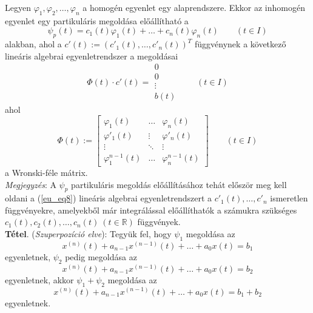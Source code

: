 \documentclass[12pt,margin=0px]{article}
\begin{document}
    \noindent Legyen $\varphi_1, \varphi_2, \ldots, \varphi_n$ a homogén egyenlet egy alaprendszere. Ekkor az inhomogén egyenlet egy partikuláris megoldása előállítható a
    \[
        \psi_{p}(t) = c_1(t)\varphi_{1}(t) + \ldots + c_n(t)\varphi_{n}(t) \qquad (t \in I)
    \]
    alakban, ahol a $c'(t) := (c'_{1}(t), \ldots, c'_{n}(t))^{T}$ függvénynek a következő lineáris algebrai egyenletrendszer a megoldásai
    \begin{equation}\label{eu_eq8}
        \Phi(t) \cdot c'(t) = \begin{array}{c}
                                0 \\
                                0 \\
                                \vdots \\
                                b(t)
                              \end{array} \qquad (t \in I)
    \end{equation}
    ahol
    \[
        \Phi(t) := \left[ \begin{array}{ccc}
                     \varphi_1(t) & \ldots & \varphi_n(t) \\
                     \varphi'_1(t) & \vdots & \varphi'_n(t) \\
                     \vdots & \ddots & \vdots \\
                     \varphi_1^{n-1}(t) & \ldots & \varphi_n^{n-1}(t)
                   \end{array}\right] \qquad (t \in I)
    \]
    a Wronski-féle mátrix.\\

    \noindent \emph{Megjegyzés}: A $\psi_{p}$ partikuláris megoldás előállításához tehát először meg kell oldani a (\ref{eu_eq8}) lineáris algebrai egyenletrendszert a $c'_{1}(t), \ldots, c'_{n}$ ismeretlen függvényekre, amelyekből már integrálással előállíthatók a számukra szükséges $c_1(t), c_2(t), \ldots, c_{n}(t)\ (t \in \mathbb{R})$ függvények.\\

    \noindent \textbf{Tétel}. (\emph{Szuperpozíció elve}): Tegyük fel, hogy $\psi_{1}$ megoldása az
    \[
        x^{(n)}(t) + a_{n-1}x^{(n-1)}(t) + \ldots + a_{0}x(t) = b_1
    \]
    egyenletnek, $\psi_2$ pedig megoldása az
    \[
        x^{(n)}(t) + a_{n-1}x^{(n-1)}(t) + \ldots + a_{0}x(t) = b_2
    \]
    egyenletnek, akkor $\psi_1 + \psi_2$ megoldása az
    \[
        x^{(n)}(t) + a_{n-1}x^{(n-1)}(t) + \ldots + a_{0}x(t) = b_1 + b_2
    \]
    egyenletnek.\\
\end{document}
